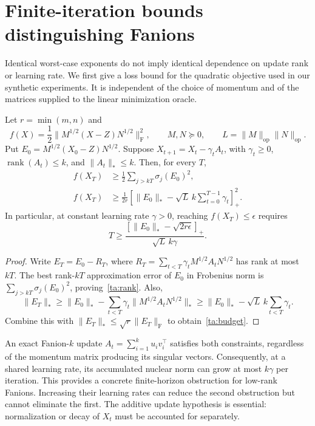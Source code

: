 
\section{Finite-iteration bounds distinguishing Fanions}
\label{ta:section}

Identical worst-case exponents do not imply identical dependence on update
rank or learning rate. We first give a loss bound for the quadratic objective
used in our synthetic experiments. It is independent of the choice of
momentum and of the matrices supplied to the linear minimization oracle.

\begin{theorem}
\label{ta:obstruction}
Let $r=\min(m,n)$ and
\[
 f(X)=\frac12\|M^{1/2}(X-Z)N^{1/2}\|_{\mathrm F}^2,
 \qquad M,N\succeq0,
 \qquad L=\|M\|_{\mathrm{op}}\|N\|_{\mathrm{op}}.
\]
Put $E_0=M^{1/2}(X_0-Z)N^{1/2}$. Suppose
$X_{t+1}=X_t-\gamma_t A_t$, with $\gamma_t\geq0$,
$\operatorname{rank}(A_t)\leq k$, and $\|A_t\|_*\leq k$.
Then, for every $T$,
\begin{align}
 f(X_T)&\geq\frac12\sum_{j>kT}\sigma_j(E_0)^2,
 \label{ta:rank}\\
 f(X_T)&\geq\frac1{2r}
 \left[\|E_0\|_*-\sqrt L\,k\sum_{t=0}^{T-1}\gamma_t\right]_+^2.
 \label{ta:budget}
\end{align}
In particular, at constant learning rate $\gamma>0$, reaching
$f(X_T)\leq\epsilon$ requires
\[
 T\geq\frac{[\|E_0\|_*-\sqrt{2r\epsilon}]_+}
 {\sqrt L\,k\gamma}.
\]
\end{theorem}
\begin{proof}
Write $E_T=E_0-R_T$, where
$R_T=\sum_{t<T}\gamma_t M^{1/2}A_tN^{1/2}$ has rank at most $kT$.
The best rank-$kT$ approximation error of $E_0$ in Frobenius norm is
$\sum_{j>kT}\sigma_j(E_0)^2$, proving~\eqref{ta:rank}.
Also,
\[
 \|E_T\|_*\geq\|E_0\|_*-\sum_{t<T}\gamma_t
 \|M^{1/2}A_tN^{1/2}\|_*
 \geq\|E_0\|_*-\sqrt L\,k\sum_{t<T}\gamma_t.
\]
Combine this with $\|E_T\|_*\leq\sqrt r\|E_T\|_{\mathrm F}$
to obtain~\eqref{ta:budget}.
\end{proof}

An exact Fanion-$k$ update $A_t=\sum_{i=1}^k u_i v_i^\top$ satisfies both
constraints, regardless of the momentum matrix producing its singular
vectors. Consequently, at a shared learning rate, its accumulated nuclear
norm can grow at most $k\gamma$ per iteration. This provides a concrete
finite-horizon obstruction for low-rank Fanions. Increasing their learning
rates can reduce the second obstruction but cannot eliminate the first.
The additive update hypothesis is essential: normalization or decay of
$X_t$ must be accounted for separately.

